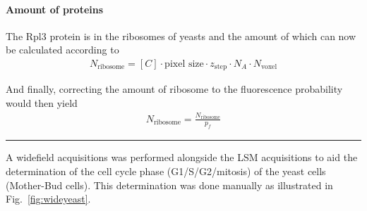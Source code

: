 \paragraph{Amount of proteins}
The Rpl3 protein is in the ribosomes of yeasts and the amount of which can now be calculated according to
\begin{align} 
N_{\text{ribosome}} = [C] \cdot \text{pixel size} \cdot z_{\text{step}} \cdot N_{A} \cdot N_{\text{voxel}}
\end{align}

And finally, correcting the amount of ribosome to the fluorescence probability would then yield
\begin{align} 
N_{\text{ribosome}} = \frac{N_{\text{ribosome}}}{p_f}
\end{align}

\begin{center}
\par\noindent\rule{0.8\textwidth}{0.4pt}
\end{center}

A widefield acquisitions was performed alongside the LSM acquisitions to aid the determination of the cell cycle phase (G1/S/G2/mitosis) of the yeast cells (Mother-Bud cells). This determination was done manually as illustrated in Fig.~\ref{fig:wideyeast}. 

